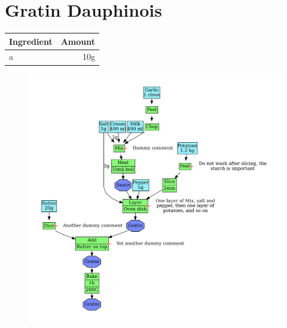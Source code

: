 \documentclass{book}
\begin{document}
\newpage
\section*{Gratin Dauphinois}
\begin{tabular}{|l|r|}
    \hline
    \textbf{Ingredient}& \textbf{Amount}\\
     \hline
    a&10g\\
    \hline
\end{tabular}
\begin{figure}[!b]
    \includegraphics[width=1.3\textwidth,page=1]{gratin_dauphinois.pdf}
\end{figure}
\end{document}
